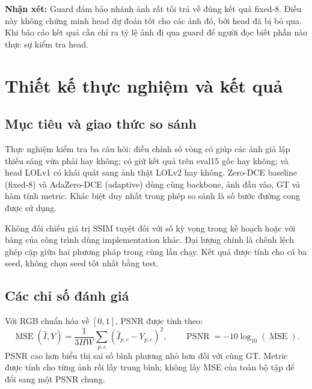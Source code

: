 \begin{center}
\end{center}

\textbf{Nhận xét:} Guard đảm bảo nhánh ảnh rất tối trả về đúng kết quả fixed-8. Điều này không chứng minh head dự đoán tốt cho các ảnh đó, bởi head đã bị bỏ qua. Khi báo cáo kết quả cần chỉ ra tỷ lệ ảnh đi qua guard để người đọc biết phần nào thực sự kiểm tra head.

\section{Thiết kế thực nghiệm và kết quả}
\subsection{Mục tiêu và giao thức so sánh}
Thực nghiệm kiểm tra ba câu hỏi: điều chỉnh số vòng có giúp các ảnh giả lập thiếu sáng vừa phải hay không; có giữ kết quả trên eval15 gốc hay không; và head LOLv1 có khái quát sang ảnh thật LOLv2 hay không. Zero-DCE baseline (fixed-8) và AdaZero-DCE (adaptive) dùng cùng backbone, ảnh đầu vào, GT và hàm tính metric. Khác biệt duy nhất trong phép so sánh là số bước đường cong được sử dụng.

Không đối chiếu giá trị SSIM tuyệt đối với số kỳ vọng trong kế hoạch hoặc với bảng của công trình dùng implementation khác. Đại lượng chính là chênh lệch ghép cặp giữa hai phương pháp trong cùng lần chạy. Kết quả được tính cho cả ba seed, không chọn seed tốt nhất bằng test.

\subsection{Các chỉ số đánh giá}
Với RGB chuẩn hóa về $[0,1]$, PSNR được tính theo:
\begin{equation}
\operatorname{MSE}(\widehat I,Y)=\frac{1}{3HW}\sum_{p,c}(\widehat I_{p,c}-Y_{p,c})^2,\qquad
\operatorname{PSNR}=-10\log_{10}(\operatorname{MSE}).
\end{equation}
PSNR cao hơn biểu thị sai số bình phương nhỏ hơn đối với cùng GT. Metric được tính cho từng ảnh rồi lấy trung bình; không lấy MSE của toàn bộ tập để đổi sang một PSNR chung.

